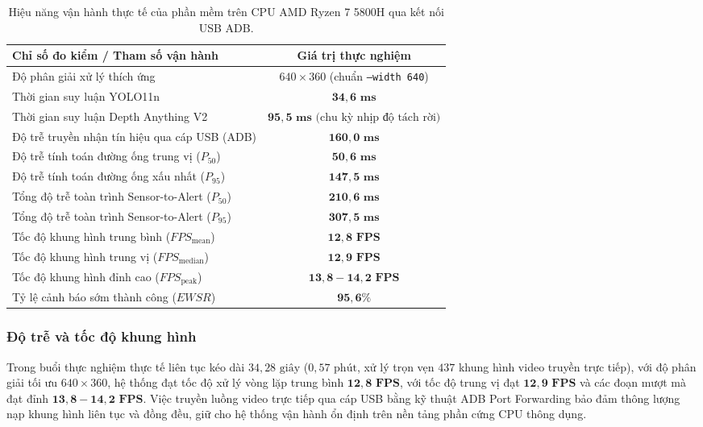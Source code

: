 
\begin{table}[htbp]
\centering
\caption{Hiệu năng vận hành thực tế của phần mềm trên CPU AMD Ryzen 7 5800H qua kết nối USB ADB.}
\label{tab:software_runtime_benchmark}
\begin{tabular}{|l|c|}
\hline
\textbf{Chỉ số đo kiểm / Tham số vận hành} & \textbf{Giá trị thực nghiệm} \\ \hline
Độ phân giải xử lý thích ứng & $640 \times 360$ (chuẩn \texttt{--width 640}) \\ \hline
Thời gian suy luận YOLO11n & $\mathbf{34,6\text{ ms}}$ \\ \hline
Thời gian suy luận Depth Anything V2 & $\mathbf{95,5\text{ ms}}\text{ (chu kỳ nhịp độ tách rời)}$ \\ \hline
Độ trễ truyền nhận tín hiệu qua cáp USB (ADB) & $\mathbf{160,0\text{ ms}}$ \\ \hline
Độ trễ tính toán đường ống trung vị ($P_{50}$) & $\mathbf{50,6\text{ ms}}$ \\ \hline
Độ trễ tính toán đường ống xấu nhất ($P_{95}$) & $\mathbf{147,5\text{ ms}}$ \\ \hline
Tổng độ trễ toàn trình Sensor-to-Alert ($P_{50}$) & $\mathbf{210,6\text{ ms}}$ \\ \hline
Tổng độ trễ toàn trình Sensor-to-Alert ($P_{95}$) & $\mathbf{307,5\text{ ms}}$ \\ \hline
Tốc độ khung hình trung bình ($FPS_{\text{mean}}$) & $\mathbf{12,8\text{ FPS}}$ \\ \hline
Tốc độ khung hình trung vị ($FPS_{\text{median}}$) & $\mathbf{12,9\text{ FPS}}$ \\ \hline
Tốc độ khung hình đỉnh cao ($FPS_{\text{peak}}$) & $\mathbf{13,8 - 14,2\text{ FPS}}$ \\ \hline
Tỷ lệ cảnh báo sớm thành công ($EWSR$) & $\mathbf{95,6\%}$ \\ \hline
\end{tabular}
\end{table}

\subsubsection{Độ trễ và tốc độ khung hình}
Trong buổi thực nghiệm thực tế liên tục kéo dài $34,28\text{ giây}$ ($0,57\text{ phút}$, xử lý trọn vẹn $437$ khung hình video truyền trực tiếp), với độ phân giải tối ưu $640 \times 360$, hệ thống đạt tốc độ xử lý vòng lặp trung bình $\mathbf{12,8\text{ FPS}}$, với tốc độ trung vị đạt $\mathbf{12,9\text{ FPS}}$ và các đoạn mượt mà đạt đỉnh $\mathbf{13,8 - 14,2\text{ FPS}}$. Việc truyền luồng video trực tiếp qua cáp USB bằng kỹ thuật ADB Port Forwarding bảo đảm thông lượng nạp khung hình liên tục và đồng đều, giữ cho hệ thống vận hành ổn định trên nền tảng phần cứng CPU thông dụng.

